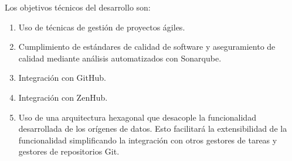 Los objetivos  técnicos del desarrollo son:

\begin{enumerate}
	\item Uso de técnicas de gestión de proyectos ágiles.
	\item Cumplimiento de estándares de calidad de software y aseguramiento de calidad mediante análisis automatizados con Sonarqube.
	\item Integración con GitHub. 
	\item Integración con ZenHub.
	\item Uso de una arquitectura hexagonal \cite{hexagonal-architecture} que desacople la funcionalidad desarrollada de los orígenes de datos. Esto facilitará la extensibilidad de la funcionalidad simplificando la  integración con otros gestores de tareas y gestores de repositorios Git.
\end{enumerate}

